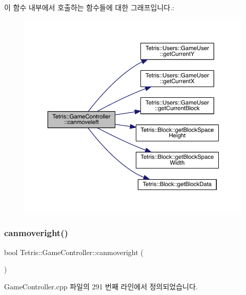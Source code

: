 이 함수 내부에서 호출하는 함수들에 대한 그래프입니다.\+:
\nopagebreak
\begin{figure}[H]
\begin{center}
\leavevmode
\includegraphics[width=350pt]{db/dd2/class_tetris_1_1_game_controller_ae541cf926ccdce47a185c94a0c80b642_cgraph}
\end{center}
\end{figure}
\mbox{\label{class_tetris_1_1_game_controller_a6c8189bb893502049396a7de1a73a88c}} 
\subsubsection{\texorpdfstring{canmoveright()}{canmoveright()}\hspace{0.1cm}{\footnotesize\ttfamily [1/2]}}
{\footnotesize\ttfamily bool Tetris\+::\+Game\+Controller\+::canmoveright (\begin{DoxyParamCaption}{ }\end{DoxyParamCaption})}



Game\+Controller.\+cpp 파일의 291 번째 라인에서 정의되었습니다.


